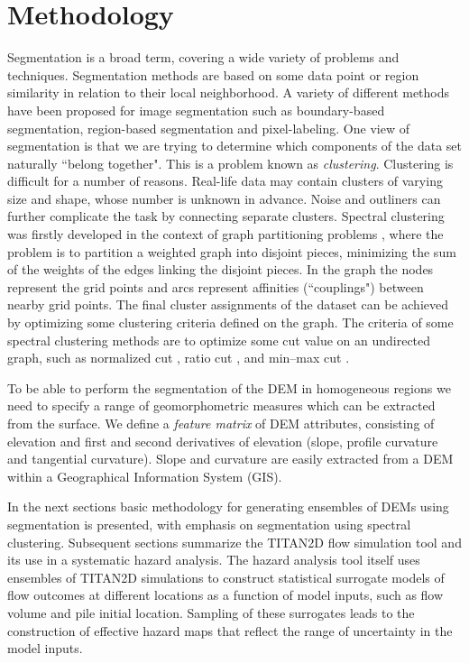 \documentclass[12pt,letterpaper]{article}
\begin{document}
\section{Methodology}
Segmentation is a broad term, covering a wide variety of problems and techniques. 
Segmentation methods are based on some data point or region similarity
in relation to their local neighborhood. A variety of different methods have been proposed 
for image segmentation such as boundary-based segmentation, region-based segmentation and pixel-labeling. 
One view of segmentation is that we are trying to determine which components of the data set naturally 
``belong together". This is a problem known as \textit{clustering}. Clustering is difficult for a number of reasons. 
Real-life data may contain clusters of varying size and shape, whose number is unknown in advance. Noise 
and outliners can further complicate the task by connecting separate clusters. 
Spectral clustering was firstly developed in the context of graph partitioning problems \citep{Donath1973}, 
where the problem is to partition a weighted graph into disjoint pieces, minimizing the sum of the weights of the edges 
linking the disjoint pieces. In the graph the nodes represent the grid points and arcs represent affinities (``couplings") 
between nearby grid points. The final cluster assignments of the dataset can be achieved by optimizing some clustering 
criteria defined on the graph. The criteria of some spectral clustering methods are to optimize some cut value on an 
undirected graph, such as normalized cut \citep{ShiMalik2000}, ratio cut \citep{Hagen1992}, and min--max cut \citep{Ding2001}. 

To be able to perform the segmentation of the DEM in homogeneous regions
we need to specify a range of geomorphometric measures which can be extracted
from the surface. We define a \textit{feature matrix} of DEM attributes, consisting of elevation and 
first and second derivatives of elevation (slope, profile curvature and tangential curvature).
Slope and curvature are easily extracted from a DEM within a Geographical Information System (GIS).

In the next sections basic methodology for generating ensembles of DEMs using segmentation is presented, with emphasis 
on segmentation using spectral clustering.  Subsequent sections summarize the TITAN2D flow simulation tool and its use 
in a systematic hazard analysis. The hazard analysis tool itself uses ensembles of TITAN2D simulations to construct statistical surrogate models of flow outcomes at different locations as a function of model inputs, such as flow volume and pile initial 
location. Sampling of these surrogates leads to the construction of effective hazard maps that reflect the range of uncertainty 
in the model inputs.
\end{document}
